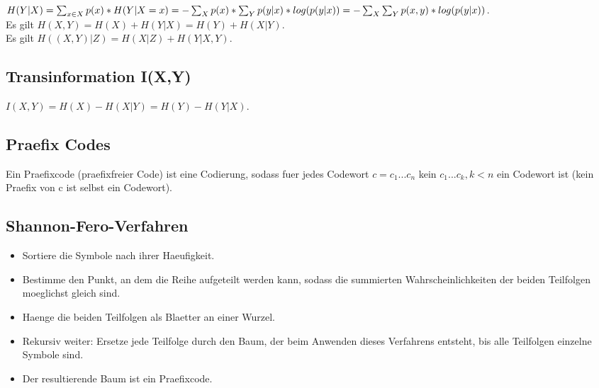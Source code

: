 \documentclass[a4paper]{scrreprt}
\begin{document}
$H(Y|X) = \sum_{x \in X}p(x)*H(Y|X = x)\\
= -\sum_X p(x)*\sum_Y p(y|x)*log(p(y|x))\\
= -\sum_X \sum_Y p(x,y)*log(p(y|x))$.\\

Es gilt $H(X,Y) = H(X) + H(Y|X) = H(Y) + H(X|Y)$.\\
Es gilt $H((X,Y)|Z) = H(X|Z) + H(Y|X,Y)$.

\subsection{Transinformation I(X,Y)}
$I(X,Y) = H(X) - H(X|Y) = H(Y) - H(Y|X)$.

\subsection{Praefix Codes}
Ein Praefixcode (praefixfreier Code) ist eine Codierung, sodass fuer jedes Codewort $c = c_1...c_n$ kein $c_1...c_k, k < n$ ein Codewort ist (kein Praefix von c ist selbst ein Codewort).

\subsection{Shannon-Fero-Verfahren}
\begin{itemize}
	\item Sortiere die Symbole nach ihrer Haeufigkeit.
	\item Bestimme den Punkt, an dem die Reihe aufgeteilt werden kann, sodass die summierten Wahrscheinlichkeiten der beiden Teilfolgen moeglichst gleich sind.
	\item Haenge die beiden Teilfolgen als Blaetter an einer Wurzel.
	\item Rekursiv weiter: Ersetze jede Teilfolge durch den Baum, der beim Anwenden dieses Verfahrens entsteht, bis alle Teilfolgen einzelne Symbole sind.
	\item Der resultierende Baum ist ein Praefixcode.
\end{itemize}
\end{document}
